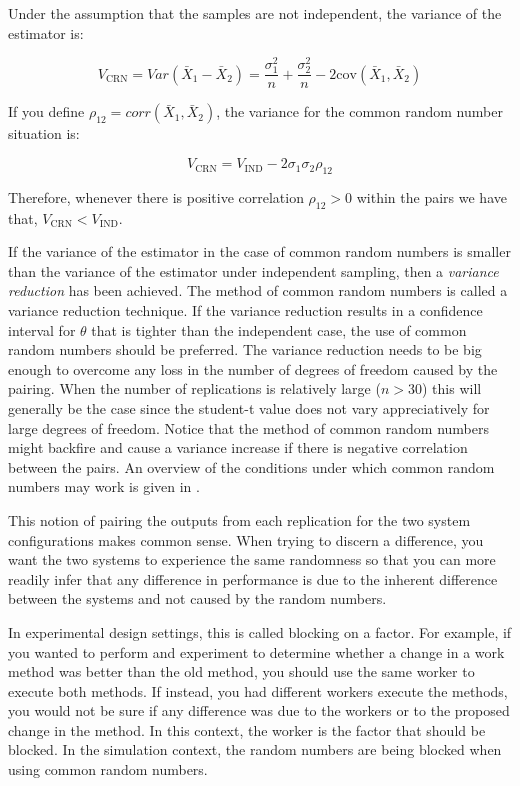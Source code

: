 \documentclass[
]{book}
\theoremstyle{definition}
\theoremstyle{definition}
\theoremstyle{definition}
\theoremstyle{definition}
\theoremstyle{remark}
\begin{document}
Under the assumption that the samples are not independent, the variance
of the estimator is:

\[V_{\text{CRN}} = Var(\bar{X}_1 - \bar{X}_2) = \dfrac{\sigma_1^2}{n} + \dfrac{\sigma_2^2}{n} - 2\text{cov}(\bar{X}_1, \bar{X}_2)\]

If you define \(\rho_{12} = corr(\bar{X}_1, \bar{X}_2)\), the variance for
the common random number situation is:

\[V_{\text{CRN}} = V_{\text{IND}} - 2\sigma_1 \sigma_2 \rho_{12}\]

Therefore, whenever there is positive correlation \(\rho_{12} > 0\) within
the pairs we have that, \(V_{\text{CRN}} < V_{\text{IND}}\).

If the variance of the estimator in the case of common random numbers is
smaller than the variance of the estimator under independent sampling,
then a \emph{variance reduction} has been achieved. The method of common
random numbers is called a variance reduction technique. If the variance
reduction results in a confidence interval for \(\theta\) that is tighter
than the independent case, the use of common random numbers should be
preferred. The variance reduction needs to be big enough to overcome any
loss in the number of degrees of freedom caused by the pairing. When the
number of replications is relatively large (\(n > 30\)) this will
generally be the case since the student-t value does not vary
appreciatively for large degrees of freedom. Notice that the method of
common random numbers might backfire and cause a variance increase if
there is negative correlation between the pairs. An overview of the
conditions under which common random numbers may work is given in
\citep{law2007simulation}.

This notion of pairing the outputs from each replication for the two
system configurations makes common sense. When trying to discern a
difference, you want the two systems to experience the same randomness
so that you can more readily infer that any difference in performance is
due to the inherent difference between the systems and not caused by the
random numbers.

In experimental design settings, this is called blocking on a factor.
For example, if you wanted to perform and experiment to determine
whether a change in a work method was better than the old method, you
should use the same worker to execute both methods. If instead, you had
different workers execute the methods, you would not be sure if any
difference was due to the workers or to the proposed change in the
method. In this context, the worker is the factor that should be
blocked. In the simulation context, the random numbers are being blocked
when using common random numbers.
\end{document}
